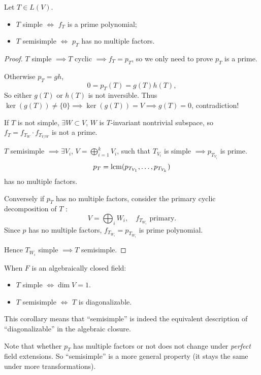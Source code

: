 \begin{proposition}
	Let $T\in L(V)$.
	\begin{itemize}
		\item $T$ simple $\iff$ $f_T$ is a prime polynomial;
		\item $T$ semisimple $\iff$ $p_T$ has no multiple factors.
	\end{itemize}
\end{proposition}
\begin{proof}[Proof]
    $T$ simple $ \implies T$ cyclic $ \implies f_T = p_T$,
	so we only need to prove $p_T$ is a prime.

	Otherwise $p_T = gh$,
	\[
	0 = p_T(T) = g(T) h(T),
	\]
	So either $g(T)$ or $h(T)$ is not inversible.
	Thus $\ker(g(T)) \ne \{0\}\implies \ker(g(T)) = V\implies g(T) = 0$,
	contradiction!

	If $T$ is not simple, $\exists W \subset V$, $W$ is $T$-invariant nontrivial
	subspace, so $f_T = f_{T_W} \cdot f_{T_{V / W}}$ is not a prime.

	\vspace{1em}
	$T$ semisimple $ \implies \exists V_i$, $V = \bigoplus_{i=1}^k V_i$,
	such that $T_{V_i}$ is simple $ \implies p_{T_{V_i}}$ is prime.
	\[
	p_T = \operatorname{lcm}(p_{T_{V_1}}, \dots, p_{T_{V_k}})
	\]
	has no multiple factors.

	Conversely if $p_T$ has no multiple factors, consider the primary cyclic
	decomposition of $T$ :
	\[
	V = \bigoplus_i W_i,\quad f_{T_{W_i}} \text{ primary.}
	\]
	Since $p$ has no multiple factors,
	$f_{T_{W_i}} = p_{T_{W_i}}$ is prime polynomial.

	Hence $T_{W_i}$ simple $ \implies T$ semisimple.
\end{proof}

\begin{corollary}
    When $F$ is an algebraically closed field:
	\begin{itemize}
		\item $T$ simple $\iff \dim V = 1$.
		\item $T$ semisimple $\iff$ $T$ is diagonalizable.
	\end{itemize}
\end{corollary}

This corollary means that ``semisimple'' is indeed the
equivalent description of ``diagonalizable'' in the algebraic closure.

Note that whether $p_T$ has multiple factors or not does not
change under \textit{perfect} field extensions.
So ``semisimple'' is a more general property (it stays the same
under more transformations).

